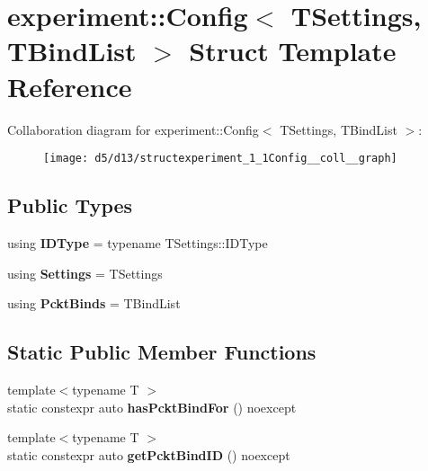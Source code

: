 \hypertarget{structexperiment_1_1Config}{}\section{experiment\+:\+:Config$<$ T\+Settings, T\+Bind\+List $>$ Struct Template Reference}
\label{structexperiment_1_1Config}


Collaboration diagram for experiment\+:\+:Config$<$ T\+Settings, T\+Bind\+List $>$\+:\nopagebreak
\begin{figure}[H]
\begin{center}
\leavevmode
\texttt{[image: d5/d13/structexperiment\_1\_1Config\_\_coll\_\_graph]}
\end{center}
\end{figure}
\subsection*{Public Types}
\begin{DoxyCompactItemize}
\item 
\hypertarget{structexperiment_1_1Config_a96431f152cbf395d1072a953b9cbebbd}{}using {\bfseries I\+D\+Type} = typename T\+Settings\+::\+I\+D\+Type\label{structexperiment_1_1Config_a96431f152cbf395d1072a953b9cbebbd}

\item 
\hypertarget{structexperiment_1_1Config_a6fd649e27ccccdb8aff35cee3cb331aa}{}using {\bfseries Settings} = T\+Settings\label{structexperiment_1_1Config_a6fd649e27ccccdb8aff35cee3cb331aa}

\item 
\hypertarget{structexperiment_1_1Config_a80a051a9b92ba43f95bd555fa2b0c038}{}using {\bfseries Pckt\+Binds} = T\+Bind\+List\label{structexperiment_1_1Config_a80a051a9b92ba43f95bd555fa2b0c038}

\end{DoxyCompactItemize}
\subsection*{Static Public Member Functions}
\begin{DoxyCompactItemize}
\item 
\hypertarget{structexperiment_1_1Config_a2980bcb1deb87a1572e76c9da19845ce}{}{\footnotesize template$<$typename T $>$ }\\static constexpr auto {\bfseries has\+Pckt\+Bind\+For} () noexcept\label{structexperiment_1_1Config_a2980bcb1deb87a1572e76c9da19845ce}

\item 
\hypertarget{structexperiment_1_1Config_ad62e6c85c77cb2bf5abd2c20f73ef483}{}{\footnotesize template$<$typename T $>$ }\\static constexpr auto {\bfseries get\+Pckt\+Bind\+I\+D} () noexcept\label{structexperiment_1_1Config_ad62e6c85c77cb2bf5abd2c20f73ef483}

\end{DoxyCompactItemize}
